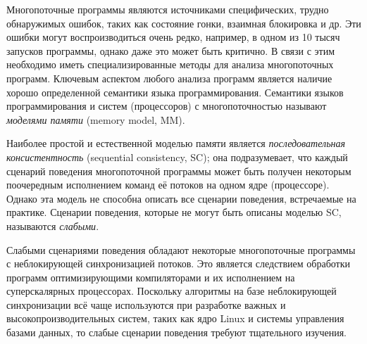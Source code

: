 
{\actuality}
Многопоточные программы являются источниками специфических,
трудно обнаружимых ошибок,
таких как состояние гонки, взаимная блокировка и др.
Эти ошибки могут воспроизводиться очень редко, например, в одном из 10 тысяч запусков
программы, однако даже это может быть критично.
В связи с этим необходимо иметь специализированные методы для анализа многопоточных программ.
Ключевым аспектом любого анализа программ является наличие хорошо определенной семантики языка программирования.
Семантики языков программирования и систем (процессоров) с многопоточностью называют \emph{моделями памяти} (memory model, MM).

Наиболее простой и естественной моделью памяти является 
\emph{последовательная консистентность} (sequential consistency, SC);
она подразумевает, что каждый сценарий поведения многопоточной программы может быть
получен некоторым поочередным исполнением команд её потоков на одном ядре (процессоре).
Однако эта модель не способна описать все сценарии поведения, встречаемые на практике.
Сценарии поведения, которые не могут быть описаны моделью SC, называются \emph{слабыми}.

Слабыми сценариями поведения обладают некоторые многопоточные программы с неблокирующей синхронизацией потоков.
Это является следствием обработки программ оптимизирующими компиляторами и их исполнением
на суперскалярных процессорах.
Поскольку алгоритмы на базе неблокирующей синхронизации всё чаще используются
при разработке важных и высокопроизводительных систем, таких как ядро Linux и системы управления базами данных,
то слабые сценарии поведения требуют тщательного изучения. 


